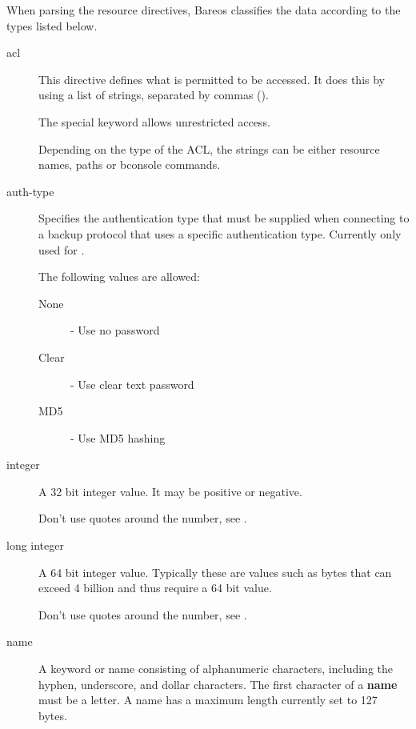When parsing the resource directives, Bareos classifies the data according to
the types listed below.

\begin{description}

\item [acl]
    \label{DataTypeAcl}
This directive defines what is permitted to be accessed.
It does this by using a list of strings, separated by commas (\parameter{,}).

The special keyword  allows unrestricted access.

Depending on the type of the ACL, the strings can be either resource names, paths or bconsole commands.


\item [auth-type]
    \label{DataTypeAuthType}
Specifies the authentication type that must be supplied when connecting to
a backup protocol that uses a specific authentication type.
Currently only used for .

The following values are allowed:
\begin{description}
\item[None] - Use no password
\item[Clear] - Use clear text password
\item[MD5] - Use MD5 hashing
\end{description}


\item [integer]
    \label{DataTypeInteger}
   A 32 bit integer value. It may be positive or negative.

   Don't use quotes around the number, see .


\item [long integer]
    \label{DataTypeLongInteger}
   A 64 bit integer value. Typically these  are values such as bytes that can
exceed 4 billion and thus  require a 64 bit value.

   Don't use quotes around the number, see .


\item [name]
    \label{DataTypeName}
   A keyword or name consisting of alphanumeric characters, including the
hyphen, underscore, and dollar  characters. The first character of a {\bf
name} must be  a letter.  A name has a maximum length currently set to 127
bytes.


\end{description}
